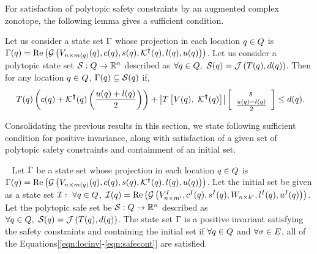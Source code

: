 For satisfaction of polytopic safety constraints by an augmented
complex zonotope, the following lemma gives a sufficient condition.
%
\begin{lemma}
  Let us consider a state set $\Gamma$ whose projection in each
  location $q \in Q$ is $\Gamma(q) =
  \operatorname{\operatorname{Re}}\left(\mathcal{G}\left(V_{n\times
      m(q)}(q),c(q),s(q),\mathcal{K}^{\bm{\dagger}}(q),l(q),u(q)\right)\right)$.
  Let us consider a polytopic state set
  $\mathcal{S}:Q\rightarrow\mathbb{R}^n$ described as $\forall
  q\in Q,~\mathcal{S}(q)=\mathcal{J}\left(T(q),d(q)\right)$. Then
  for any location $q\in Q$, $\Gamma(q)\subseteq
  \mathcal{S}(q)$ if,
\begin{align}~\label{eqn:safecont}
T(q)\left(c(q)+\mathcal{K}^{\bm{\dagger}}(q)\left(\frac{u(q)+l(q)}{2}\right)\right)+\left|T\left[V(q),~\mathcal{K}^{\bm{\dagger}}(q)\right]\right|\left[\begin{array}{l}{\hspace{1.5em}s}\\{\frac{u(q)-l(q)}{2}} \end{array}\right]\leq d(q).
\end{align}
\end{lemma}

Consolidating the previous results in this section, we state following
sufficient condition for positive invariance, along with satisfaction
of a given set of polytopic safety constraints and containment of an initial set.

\begin{theorem}~\label{thm:main} Let $\Gamma$ be a state set whose
  projection in each location $q\in Q$ is
  $\Gamma(q) = \operatorname{\operatorname{Re}}\left(\mathcal{G}\left(V_{n\times
      m(q)}(q),c(q),s(q),\mathcal{K}^{\bm{\dagger}}(q),l(q),u(q)\right)\right)$.
  Let the initial set be given as a state set
  $\mathcal{I}:~\forall q\in Q$,
  $\mathcal{I}(q)=\operatorname{\operatorname{Re}}\left(\mathcal{G}\left(V^I_{n\times m^\prime
  },c^I(q),s^I(q),W_{n\times
      k^\prime},l^I(q),u^I(q)\right)\right)$.  Let the polytopic safe set
  be $\mathcal{S}:Q\rightarrow\mathbb{R}^n$ described as $\forall
  q\in Q,~\mathcal{S}(q)=\mathcal{J}\left(T(q),d(q)\right)$.
  The state set $\Gamma$ is a positive invariant satisfying the
  safety constraints and containing the initial set if $\forall
  q\in Q$ and $\forall \sigma\in E$, all of the
  Equations[\ref{eqn:locinv}-\ref{eqn:safecont}] are satisfied.
\end{theorem}
